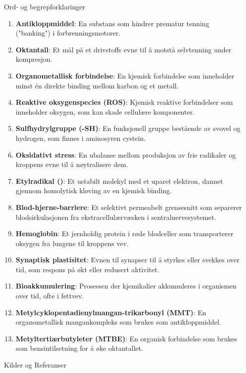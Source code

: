 \documentclass[final]{beamer}
\newlength{\sepwidth}
\newlength{\colwidth}
\newcommand{\separatorcolumn}{\begin{column}{\sepwidth}\end{column}}
\begin{document}
\begin{frame}[t]
\begin{columns}[t]
\begin{column}{\colwidth}
\begin{block}{Ord- og begrepforklaringer}
\begin{enumerate}
					\item \textbf{Antikloppmiddel}: En substans som hindrer prematur tenning ("banking") i
					      forbrenningsmotorer.
					\item \textbf{Oktantall}: Et mål på et drivstoffs evne til å motstå selvtenning under
					      kompresjon.
					\item \textbf{Organometallisk forbindelse}: En kjemisk forbindelse som inneholder minst én
					      direkte binding mellom karbon og et metall.
					\item \textbf{Reaktive oksygenspecies (ROS)}: Kjemisk reaktive forbindelser som inneholder
					      oksygen, som kan skade cellulære komponenter.
					\item \textbf{Sulfhydrylgruppe (-SH)}: En funksjonell gruppe bestående av svovel og
					      hydrogen, som finnes i aminosyren cystein.
					\item \textbf{Oksidativt stress}: En ubalanse mellom produksjon av frie radikaler og
					      kroppens evne til å nøytralisere dem.
					\item \textbf{Etylradikal (\textbullet{})}: Et ustabilt molekyl med et uparet
					      elektron, dannet gjennom homolytisk kløving av en kjemisk binding.
					\item \textbf{Blod-hjerne-barriere}: Et selektivt permeabelt grensesnitt som separerer
					      blodsirkulasjonen fra ekstracellulærvæsken i sentralnervesystemet.
					\item \textbf{Hemoglobin}: Et jernholdig protein i røde blodceller som transporterer
					      oksygen fra lungene til kroppens vev.
					\item \textbf{Synaptisk plastisitet}: Evnen til synapser til å styrkes eller svekkes over
					      tid, som respons på økt eller redusert aktivitet.
					\item \textbf{Bioakkumulering}: Prosessen der kjemikalier akkumuleres i organismen over
					      tid, ofte i fettvev.
					\item \textbf{Metylcyklopentadienylmangan-trikarbonyl (MMT)}: En organometallisk
					      mangankompleks som brukes som antikloppmiddel.
					\item \textbf{Metyltertiærbutyleter (MTBE)}: En organisk forbindelse som brukes som
					      bensintilsetning for å øke oktantallet.
				\end{enumerate}
			\end{block}

			\begin{block}{Kilder og Referanser}

				\nocite{*}
				\footnotesize{}

			\end{block}

		\end{column}
		\separatorcolumn

	\end{columns}
\end{frame}
\end{document}
